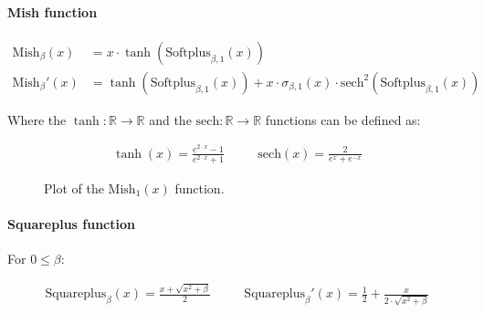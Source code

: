 \documentclass[titlepage]{article}
\begin{document}
        \paragraph{Mish function}

          \begin{align*}
            \text{Mish}_\beta (x)
              & = x \cdot \tanh(\text{Softplus}_{\beta, 1} (x)) \\
            \text{Mish}_\beta' (x)
              & = \tanh(\text{Softplus}_{\beta, 1} (x))
                  +
                  x
                  \cdot
                  \sigma_{\beta, 1} (x)
                  \cdot
                  \text{sech}^2 \left( \text{Softplus}_{\beta, 1} (x) \right)
          \end{align*}

          Where the $\tanh : \mathbb{R} \rightarrow \mathbb{R}$ and the
          $\text{sech} : \mathbb{R} \rightarrow \mathbb{R}$ functions can be
          defined as:

          \begin{align*}
            \tanh(x) = \frac{e^{2 \cdot x} -1}{e^{2 \cdot x} + 1}
            & \quad &
            \text{sech} (x) = \frac{2}{e^x + e^{-x}}
          \end{align*}

          \begin{figure}[!htb]
            \centering
            \caption{%
              Plot of the $\text{Mish}_{1}(x)$ function.
            }
          \end{figure}

        \paragraph{Squareplus function}

          For $0 \leq \beta$:

          \begin{align*}
            \text{Squareplus}_{\beta} (x) = \frac{x + \sqrt{x^2 + \beta}}{2}
            & \quad &
            \text{Squareplus}_{\beta}' (x)
              = \frac{1}{2} + \frac{x}{2 \cdot \sqrt{x^2 + \beta}}
          \end{align*}
\end{document}
